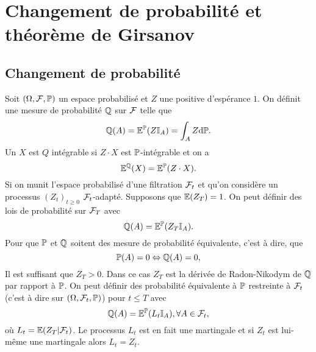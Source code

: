 \section{Changement de probabilité et théorème de Girsanov}
\subsection{Changement de probabilité}
Soit $(\Omega, \mathcal{F}, \mathbb{P})$ un espace probabilisé et $Z$ une \va positive d'espérance $1$. On définit une mesure de probabilité $\mathbb{Q}$ sur $\mathcal{F}$ telle que 
$$
\mathbb{Q}(A)
 = \mathbb{E}^{\mathbb{P}}(Z\mathbb{I}_A) = \int_A Z\text{d}\mathbb{P}.
$$
Un \va $X$ est $Q$ intégrable si $Z\cdot X$ est $\mathbb{P}$-intégrable et on a 
$$
\mathbb{E}^{\mathbb{Q}}(X) = \mathbb{E}^{\mathbb{P}}(Z\cdot X).
$$
Si on munit l'espace probabilisé d'une filtration $\mathcal{F}_t$ et qu'on considère un processus $(Z_t)_{t\geq 0}$ $\mathcal{F}_t$-adapté. Supposons que $\mathbb{E}(Z_T) = 1$. On peut définir des lois de probabilité sur $\mathcal{F}_T$ avec 
$$
\mathbb{Q}(A) = \mathbb{E}^{\mathbb{P}}(Z_T\mathbb{I}_A).
$$
Pour que $\mathbb{P}$ et $\mathbb{Q}$ soitent des mesure de probabilité équivalente, c'est à dire, que 
$$
\mathbb{P}(A) = 0\Leftrightarrow \mathbb{Q}(A) = 0,
$$
Il est suffisant que $Z_T>0$. Dans ce cas $Z_T$ est la dérivée de Radon-Nikodym de $\mathbb{Q}$ par rapport à $\mathbb{P}$. On peut définir des probabilité équivalente à $\mathbb{P}$ restreinte à $\mathcal{F}_t$ (c'est à dire sur $(\Omega,\mathcal{F}_t, \mathbb{P})$) pour $t\leq T$ avec 
$$
\mathbb{Q}(A) = \mathbb{E}^{\mathbb{P}}(L_t\mathbb{I}_A),\forall A\in \mathcal{F}_t,
$$
où $L_t = \mathbb{E}(Z_T|\mathcal{F}_t)$. Le processus $L_t$ est en fait une martingale et si $Z_t$ est lui-même une martingale alors $L_t = Z_t$.

